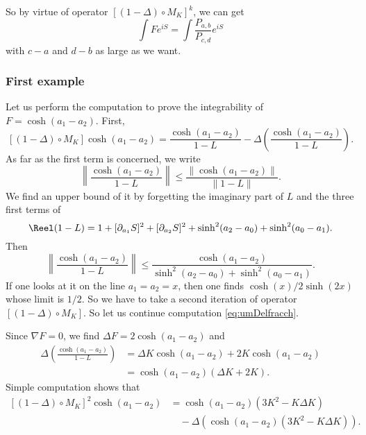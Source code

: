So by virtue of operator $[(1-\Delta)\circ M_K]^k$, we can get
\begin{equation}
\int F  e^{iS}=\int \frac{P_{a,b}}{P_{c,d}} e^{iS}
\end{equation}
with $c-a$ and $d-b$ as large as we want.

\subsubsection{First example}

Let us perform the computation to prove the integrability of $F=\cosh(a_1-a_2)$. First,
\begin{equation}  \label{eq:umDelfracch}
  [(1-\Delta)\circ M_K]\cosh(a_1-a_2)=\frac{\cosh(a_1-a_2)}{1-L}-\Delta\left( \frac{\cosh(a_1-a_2)}{1-L} \right).
\end{equation}
As far as the first term is concerned, we write
\[ 
  \left\|  \frac{\cosh(a_1-a_2)}{1-L}  \right\|\leq \frac{\| \cosh(a_1-a_2) \|}{\| 1-L \|}.
\]
We find an upper bound of it by forgetting the imaginary part of $L$ and the three first terms of
\[ 
  \Reel(1-L)=1+[\partial_{a_1}S]^2+[\partial_{a_2}S]^2+\sinh^2(a_2-a_0)+\sinh^2(a_0-a_1).
\]
Then
\[ 
  \left\| \frac{\cosh(a_1-a_2)}{1-L}\right\|\leq \frac{\cosh(a_1-a_2)}{\sinh^2(a_2-a_0)+\sinh^2(a_0-a_1)}.
\]
If one looks at it on the line $a_1=a_2=x$, then one finds $\cosh(x)/2\sinh(2x)$ whose limit is $1/2$. So we have to take a second iteration of operator $[(1-\Delta)\circ M_K]$. So let us continue computation \eqref{eq:umDelfracch}. 

Since $\nabla F=0$, we find $\Delta F=2\cosh(a_1-a_2)$ and
\begin{equation}
\begin{split}
\Delta\left( \frac{\cosh(a_1-a_2)}{1-L} \right)&=\Delta K \cosh(a_1-a_2)+2K\cosh(a_1-a_2)\\
                                               &=\cosh(a_1-a_2)(\Delta K+2K).
\end{split}
\end{equation}
Simple computation shows that 
\begin{equation}
\begin{split}
[(1-\Delta)\circ M_K]^2\cosh(a_1-a_2)&=\cosh(a_1-a_2)(3K^2-K\Delta K)\\
		&\quad-\Delta(\cosh(a_1-a_2)(3K^2-K\Delta K)).
\end{split}
\end{equation}



